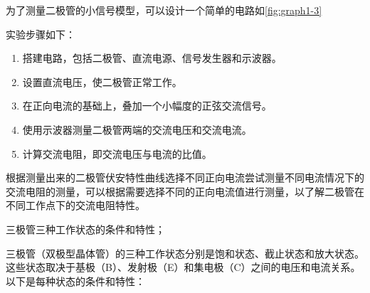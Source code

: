 \documentclass[dvipsnames, svgnames,a4paper,11pt]{article}
\begin{document}
		为了测量二极管的小信号模型，可以设计一个简单的电路如\cref{fig:graph1-3}

		\begin{figure}[htbp]
			\centering
			\quad
			\quad
			\quad

			\label{fig:graph1}
		\end{figure}



		实验步骤如下：

		\begin{enumerate}
			\item 搭建电路，包括二极管、直流电源、信号发生器和示波器。
			\item 设置直流电压，使二极管正常工作。
			\item 在正向电流的基础上，叠加一个小幅度的正弦交流信号。
			\item 使用示波器测量二极管两端的交流电压和交流电流。
			\item 计算交流电阻，即交流电压与电流的比值。
			
		\end{enumerate}

		
		根据测量出来的二极管伏安特性曲线选择不同正向电流尝试测量不同电流情况下的交流电阻的测量，可以根据需要选择不同的正向电流值进行测量，以了解二极管在不同工作点下的交流电阻特性。



		
		\begin{question}
			三极管三种工作状态的条件和特性；
		\end{question}
		
		
		三极管（双极型晶体管）的三种工作状态分别是饱和状态、截止状态和放大状态。这些状态取决于基极（B）、发射极（E）和集电极（C）之间的电压和电流关系。以下是每种状态的条件和特性：
\end{document}
